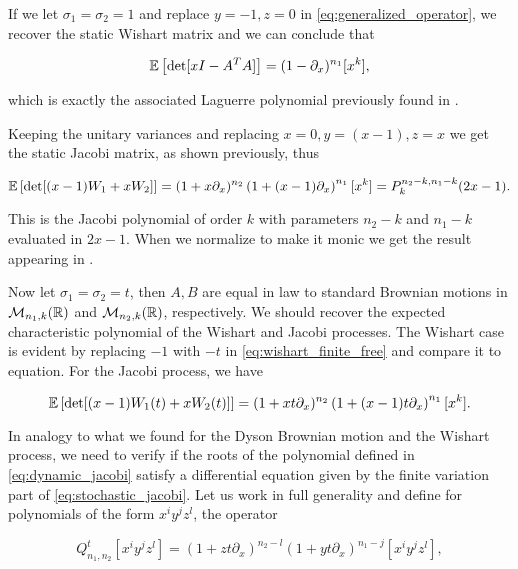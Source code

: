     If we let $\sigma_1 = \sigma_2 = 1$ and replace $y=-1, z=0$ in \eqref{eq:generalized_operator}, we recover the static Wishart matrix and we can conclude that

    \begin{equation} \label{eq:wishart_finite_free}
        \mathbb E \left[ \det[xI - A^TA] \right] = (1 - \partial_x)^{n_1}[x^k],
    \end{equation}

    \noindent which is exactly the associated Laguerre polynomial previously found in .

    Keeping the unitary variances and replacing $x=0, y=(x-1), z=x$ we get the static Jacobi matrix, as shown previously, thus 

    \begin{equation*}
        \mathbb E \left[ \det[(x-1)W_1 + xW_2] \right] = (1+x\partial_x)^{n_2} \left(1 + (x-1)\partial_x\right)^{n_1}[x^k] = P_k^{n_2 - k, n_1-k}(2x-1).
    \end{equation*}

    This is the Jacobi polynomial of order $k$ with parameters $n_2 - k$ and $n_1-k$ evaluated in $2x-1$. When we normalize to make it monic we get the result appearing in \cite{edelman1988eigenvalues}.

    Now let $\sigma_1= \sigma_2 = t$, then $A,B$ are equal in law to standard Brownian motions in $\mathcal M_{n_1,k}(\mathbb R)$ and $\mathcal M_{n_2,k}(\mathbb R)$, respectively. We should recover the expected characteristic polynomial of the Wishart and Jacobi processes. The Wishart case is evident by replacing $-1$ with $-t$ in \eqref{eq:wishart_finite_free} and compare it to equation. For the Jacobi process, we have

    \begin{equation} \label{eq:dynamic_jacobi}
        \mathbb E \left[ \det[(x-1)W_1(t) + xW_2(t)] \right] = (1+xt\partial_x)^{n_2} \left(1 + (x-1)t\partial_x\right)^{n_1}[x^k].
    \end{equation}

    In analogy to what we found for the Dyson Brownian motion and the Wishart process, we need to verify if the roots of the polynomial defined in \eqref{eq:dynamic_jacobi} satisfy a differential equation given by the finite variation part of \eqref{eq:stochastic_jacobi}. Let us work in full generality and define for polynomials of the form $x^i y^j z^l$, the operator

    \begin{equation*}
        Q_{n_1,n_2}^t [x^i y^j z^l] = (1+zt\partial_x)^{n_2-l} \left(1 + yt\partial_x\right)^{n_1 - j}[x^i y^j z^l],
    \end{equation*}

